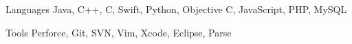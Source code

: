 


\begin{cvskills}


\cvskill
{Languages} %
{Java, C++, C, Swift, Python, Objective C, JavaScript, PHP, MySQL} %


\cvskill
{Tools} %
{Perforce, Git, SVN, Vim, Xcode, Eclipse, Parse} %






\end{cvskills}